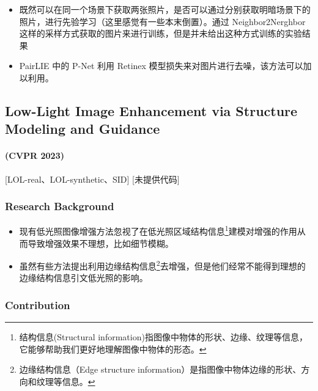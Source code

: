 \documentclass[letterpaper,10pt]{article}
\begin{document}
			\begin{itemize}
				\item [(1)]
				既然可以在同一个场景下获取两张照片，是否可以通过分别获取明暗场景下的照片，进行先验学习（这里感觉有一些本末倒置）。通过 Neighbor2Nerghbor 这样的采样方式获取的图片来进行训练，但是并未给出这种方式训练的实验结果
				\item [(2)]
				PairLIE 中的 P-Net 利用 Retinex 模型损失来对图片进行去噪，该方法可以加以利用。
			\end{itemize}
		
		\subsection{Low-Light Image Enhancement via Structure Modeling and Guidance}
		\paragraph{(CVPR 2023)} [LOL-real、LOL-synthetic、SID] [未提供代码]
		
			\subsubsection{Research Background}
			
			\begin{itemize}
				\item [(1)]
				现有低光照图像增强方法忽视了在低光照区域结构信息\footnote{结构信息(Structural information)指图像中物体的形状、边缘、纹理等信息，它能够帮助我们更好地理解图像中物体的形态。}建模对增强的作用从而导致增强效果不理想，比如细节模糊。
				\item [(2)]
				虽然有些方法提出利用边缘结构信息\footnote{边缘结构信息（Edge structure information）是指图像中物体边缘的形状、方向和纹理等信息。}去增强，但是他们经常不能得到理想的边缘结构信息引文低光照的影响。
			\end{itemize}
			
			\subsubsection{Contribution}
			
\end{document}

